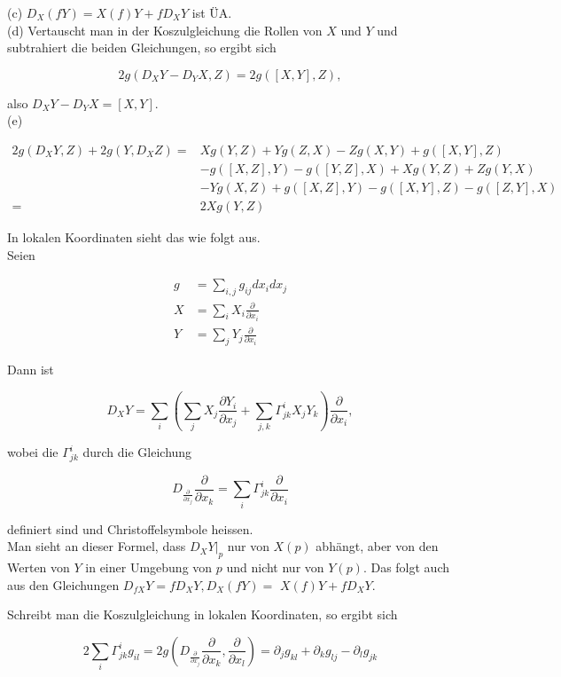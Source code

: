 \documentclass[10pt, letterpaper]{article}
\begin{document}
(c) $D_{X}(f Y)=X(f) Y+f D_{X} Y$ ist ÜA.\\
(d) Vertauscht man in der Koszulgleichung die Rollen von $X$ und $Y$ und subtrahiert die beiden Gleichungen, so ergibt sich

$$
2 g\left(D_{X} Y-D_{Y} X, Z\right)=2 g([X, Y], Z),
$$

also $D_{X} Y-D_{Y} X=[X, Y]$.\\
(e)

$$
\begin{aligned}
2 g\left(D_{X} Y, Z\right)+2 g\left(Y, D_{X} Z\right)= & X g(Y, Z)+Y g(Z, X)-Z g(X, Y)+g([X, Y], Z) \\
& -g([X, Z], Y)-g([Y, Z], X)+X g(Y, Z)+Z g(Y, X) \\
& -Y g(X, Z)+g([X, Z], Y)-g([X, Y], Z)-g([Z, Y], X) \\
= & 2 X g(Y, Z)
\end{aligned}
$$

In lokalen Koordinaten sieht das wie folgt aus.\\
Seien

$$
\begin{aligned}
g & =\sum_{i, j} g_{i j} d x_{i} d x_{j} \\
X & =\sum_{i} X_{i} \frac{\partial}{\partial x_{i}} \\
Y & =\sum_{j} Y_{j} \frac{\partial}{\partial x_{i}}
\end{aligned}
$$

Dann ist

$$
D_{X} Y=\sum_{i}\left(\sum_{j} X_{j} \frac{\partial Y_{i}}{\partial x_{j}}+\sum_{j, k} \Gamma_{j k}^{i} X_{j} Y_{k}\right) \frac{\partial}{\partial x_{i}},
$$

wobei die $\Gamma_{j k}^{i}$ durch die Gleichung

$$
D_{\frac{\partial}{\partial x_{j}}} \frac{\partial}{\partial x_{k}}=\sum_{i} \Gamma_{j k}^{i} \frac{\partial}{\partial x_{i}}
$$

definiert sind und Christoffelsymbole heissen.\\
Man sieht an dieser Formel, dass $\left.D_{X} Y\right|_{p}$ nur von $X(p)$ abhängt, aber von den Werten von $Y$ in einer Umgebung von $p$ und nicht nur von $Y(p)$. Das folgt auch aus den Gleichungen $D_{f X} Y=f D_{X} Y, D_{X}(f Y)=$ $X(f) Y+f D_{X} Y$.

Schreibt man die Koszulgleichung in lokalen Koordinaten, so ergibt sich

$$
2 \sum_{i} \Gamma_{j k}^{i} g_{i l}=2 g\left(D_{\frac{\partial}{\partial x_{j}}} \frac{\partial}{\partial x_{k}}, \frac{\partial}{\partial x_{l}}\right)=\partial_{j} g_{k l}+\partial_{k} g_{l j}-\partial_{l} g_{j k}
$$
\end{document}

